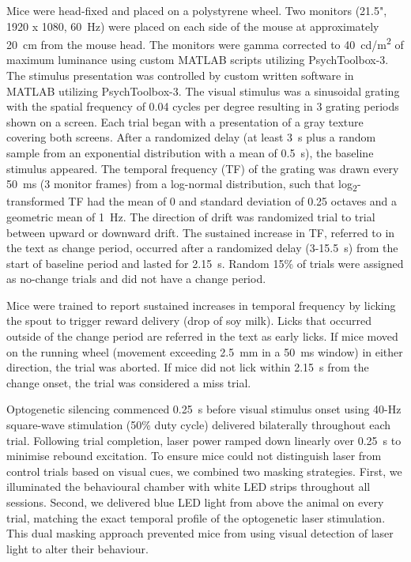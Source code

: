 Mice were head-fixed and placed on a polystyrene wheel.
Two monitors (21.5", 1920 x 1080, 60~Hz) were placed on each side of the mouse at approximately 20~cm from the mouse head.
The monitors were gamma corrected to 40~cd/m\textsuperscript{2} of maximum luminance using custom MATLAB scripts utilizing PsychToolbox-3.
The stimulus presentation was controlled by custom written software in MATLAB utilizing PsychToolbox-3.
The visual stimulus was a sinusoidal grating with the spatial frequency of 0.04 cycles per degree resulting in 3 grating periods shown on a screen.
Each trial began with a presentation of a gray texture covering both screens.
After a randomized delay (at least 3~s plus a random sample from an exponential distribution with a mean of 0.5~s), the baseline stimulus appeared.
The temporal frequency (TF) of the grating was drawn every 50~ms (3 monitor frames) from a log-normal distribution, such that log\textsubscript{2}-transformed TF had the mean of 0 and standard deviation of 0.25 octaves and a geometric mean of 1~Hz.
The direction of drift was randomized trial to trial between upward or downward drift.
The sustained increase in TF, referred to in the text as change period, occurred after a randomized delay (3-15.5~s) from the start of baseline period and lasted for 2.15~s.
Random 15\% of trials were assigned as no-change trials and did not have a change period.

Mice were trained to report sustained increases in temporal frequency by licking the spout to trigger reward delivery (drop of soy milk).
Licks that occurred outside of the change period are referred in the text as early licks.
If mice moved on the running wheel (movement exceeding 2.5~mm in a 50~ms window) in either direction, the trial was aborted.
If mice did not lick within 2.15~s from the change onset, the trial was considered a miss trial.

Optogenetic silencing commenced 0.25~s before visual stimulus onset using 40-Hz square-wave stimulation (50\% duty cycle) delivered bilaterally throughout each trial.
Following trial completion, laser power ramped down linearly over 0.25~s to minimise rebound excitation.
To ensure mice could not distinguish laser from control trials based on visual cues, we combined two masking strategies.
First, we illuminated the behavioural chamber with white LED strips throughout all sessions.
Second, we delivered blue LED light from above the animal on every trial, matching the exact temporal profile of the optogenetic laser stimulation.
This dual masking approach prevented mice from using visual detection of laser light to alter their behaviour.

